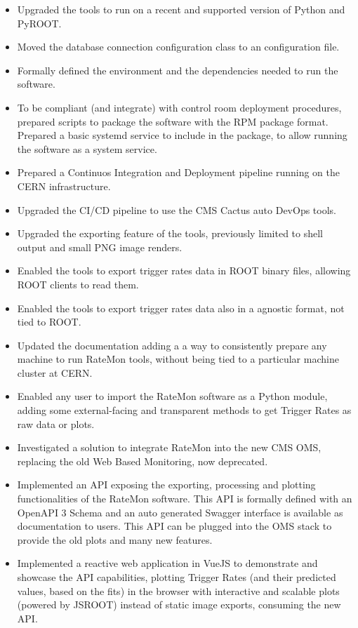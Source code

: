 \documentclass[a4, oneside, 10pt, nobib]{memoir}
\begin{document}
		\begin{itemize}

		\item Upgraded the tools to run on a recent and supported version of Python and PyROOT.
		\item Moved the database connection configuration class to an configuration file.
		\item Formally defined the environment and the dependencies needed to run the software.
		\item To be compliant (and integrate) with control room deployment procedures, prepared scripts to package the software with the RPM package format. Prepared a basic systemd service to include in the package, to allow running the software as a system service.
		\item Prepared a Continuos Integration and Deployment pipeline running on the CERN infrastructure.
		\item Upgraded the CI/CD pipeline to use the CMS Cactus \cite{DirkxCactus} auto DevOps tools.
		\item Upgraded the exporting feature of the tools, previously limited to shell output and small PNG image renders.
		\item Enabled the tools to export trigger rates data in ROOT binary files, allowing ROOT clients to read them.
		\item Enabled the tools to export trigger rates data also in a agnostic format, not tied to ROOT.
		\item Updated the documentation adding a a way to consistently prepare any machine to run RateMon tools, without being tied to a particular machine cluster at CERN.
		\item Enabled any user to import the RateMon software as a Python module, adding some external-facing and transparent methods to get Trigger Rates as raw data or plots.
		\item Investigated a solution to integrate RateMon into the new CMS OMS, replacing the old Web Based Monitoring, now deprecated.
		\item Implemented an API exposing the exporting, processing and plotting functionalities of the RateMon software. This API is formally defined with an OpenAPI 3 Schema and an auto generated Swagger interface is available as documentation to users. This API can be plugged into the OMS stack to provide the old plots and many new features.
		\item Implemented a reactive web application in VueJS to demonstrate and showcase the API capabilities, plotting Trigger Rates (and their predicted values, based on the fits) in the browser with interactive and scalable plots (powered by JSROOT) instead of static image exports, consuming the new API.

\end{itemize}
\end{document}
